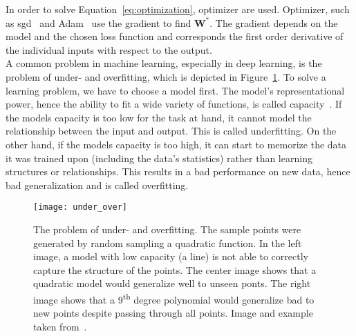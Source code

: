 In order to solve Equation~\ref{eq:optimization}, optimizer are used. Optimizer, such as \gls{sgd}~\cite{Goodfellow2016DeepLearning} and Adam~\cite{Kingma2014Adam:Optimization} use the gradient to find $\textbf{W}^*$. The gradient depends on the model and the chosen loss function and corresponds the first order derivative of the individual inputs with respect to the output.\\

A common problem in machine learning, especially in deep learning, is the problem of under- and overfitting, which is depicted in Figure~\ref{fig:under_over_fitting}. To solve a learning problem, we have to choose a model first. The model's representational power, hence the ability to fit a wide variety of functions, is called capacity~\cite{Goodfellow2016DeepLearning}. If the models capacity is too low for the task at hand, it cannot model the relationship between the input and output. This is called underfitting. On the other hand, if the models capacity is too high, it can start to memorize the data it was trained upon (including the data's statistics) rather than learning structures or relationships. This results in a bad performance on new data, hence bad generalization and is called overfitting.

\begin{figure}[htbp]
    \centering
	\texttt{[image: under\_over]}
    \caption[Under- and Overfitting]{The problem of under- and overfitting. The sample points were generated by random sampling a quadratic function. In the left image, a model with low capacity (a line) is not able to correctly capture the structure of the points. The center image shows that a quadratic model would generalize well to unseen ponts. The right image shows that a 9\textsuperscript{th} degree polynomial would generalize bad to new points despite passing through all points. Image and example taken from~\cite{Goodfellow2016DeepLearning}.}
    \label{fig:under_over_fitting}
\end{figure}

